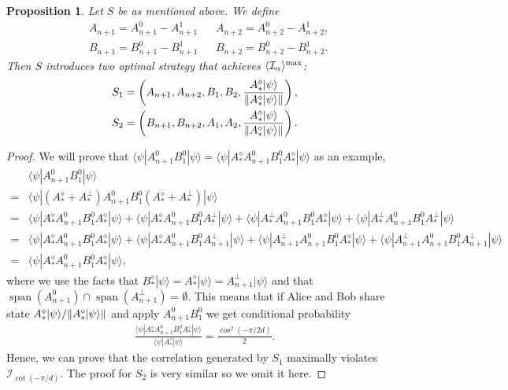 \documentclass[11pt,letterpaper]{article}
\newcommand{\ket}[1]{|#1\rangle}
\newcommand{\bra}[1]{\langle#1|}
\DeclarePairedDelimiter{\norm}{\lVert}{\rVert}
\DeclarePairedDelimiter{\ip}{\langle}{\rangle}
\DeclareMathOperator{\spn}{span}
\newcommand{\1}{\mathbb{1}}
\newcommand{\I}{\mathcal{I}}
\newtheorem{proposition}[theorem]{Proposition}
\theoremstyle{definition}
\begin{document}
\begin{proposition}
	Let $S$ be as mentioned above. We define
	\begin{align}
		&A_{n+1} = A_{n+1}^0 - A_{n+1}^1 && A_{n+2} = A_{n+2}^0 - A_{n+2}^1,\\
		&B_{n+1} = B_{n+1}^0 - B_{n+1}^1 && B_{n+2} = B_{n+2}^0 - B_{n+2}^1.
	\end{align}
	Then $S$ introduces two optimal strategy that achieves $\ip{\I_\alpha}^{\max}$:
	\begin{align}
		S_1 = \left(A_{n+1}, A_{n+2}, B_1, B_2, \frac{A_\ast^\diamond\ket{\psi}}{\norm{A_\ast^\diamond\ket{\psi}}}\right),\\
		S_2 = \left(B_{n+1}, B_{n+2}, A_1, A_2, \frac{A_\ast^\diamond\ket{\psi}}{\norm{A_\ast^\diamond\ket{\psi}}}\right).
	\end{align}
\end{proposition}
\begin{proof}
We will prove that $\bra{\psi} A_{n+1}^0B_1^0 \ket{\psi} = \bra{\psi}A_\ast^\diamond A_{n+1}^0B_1^0 A_\ast^\diamond\ket{\psi}$ as an example,
\begin{align*}
	   &\bra{\psi} A_{n+1}^0B_1^0 \ket{\psi} \\
	= &\bra{\psi}(A_\ast^\diamond + A_\ast^\perp) A_{n+1}^0B_1^0 (A_\ast^\diamond + A_\ast^\perp)\ket{\psi} \\
	= & \bra{\psi}A_\ast^\diamond A_{n+1}^0B_1^0 A_\ast^\diamond\ket{\psi} + \bra{\psi}A_\ast^\diamond A_{n+1}^0B_1^0 A_\ast^\perp\ket{\psi}
	+\bra{\psi}A_\ast^\perp A_{n+1}^0B_1^0 A_\ast^\diamond\ket{\psi} + \bra{\psi}A_\ast^\perp A_{n+1}^0B_1^0 A_\ast^\perp\ket{\psi}\\
	= & \bra{\psi}A_\ast^\diamond A_{n+1}^0B_1^0 A_\ast^\diamond\ket{\psi} + \bra{\psi}A_\ast^\diamond A_{n+1}^0B_1^0 A_{n+1}^\perp\ket{\psi} 
	+\bra{\psi}A_{n+1}^\perp A_{n+1}^0B_1^0 A_\ast^\diamond\ket{\psi} + \bra{\psi}A_{n+1}^\perp A_{n+1}^0B_1^0 A_{n+1}^\perp\ket{\psi}\\
	=&\bra{\psi}A_\ast^\diamond A_{n+1}^0B_1^0 A_\ast^\diamond\ket{\psi},
\end{align*}
where we use the facts that $B_\ast^\diamond \ket{\psi} = A_\ast^\diamond \ket{\psi} = A_{n+1}^\perp \ket{\psi}$ and that 
$\spn(A_{n+1}^0) \cap \spn(A_{n+1}^\perp) = \emptyset$. This means that if Alice and Bob share state $A_\ast^\diamond \ket{\psi}/\norm{A_\ast^\diamond \ket{\psi}}$ and apply $A_{n+1}^0B_1^0$
we get conditional probability
\begin{align}
	\frac{\bra{\psi}A_\ast^\diamond A_{n+1}^0B_1^0 A_\ast^\diamond\ket{\psi}}{\bra{\psi} A_\ast^\diamond \ket{\psi}} = 
	\frac{\cos^2(-\pi/2d)}{2}.
\end{align} 
Hence, we can prove that the correlation generated by $S_1$ maximally violates $\I_{\cot(-\pi/d)}$.
The proof for $S_2$ is very similar so we omit it here.
\end{proof}
\end{document}
